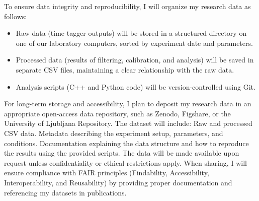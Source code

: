 \documentclass{article}
\theoremstyle{mytheoremstyle}
\theoremstyle{mytheoremstyle}
\theoremstyle{myproblemstyle}
\begin{document}
To ensure data integrity and reproducibility, I will organize my research data as follows:
\begin{itemize}
	\item Raw data (time tagger outputs) will be stored in a structured directory on one of our laboratory computers, sorted by experiment date and parameters.
	\item Processed data (results of filtering, calibration, and analysis) will be saved in separate CSV files, maintaining a clear relationship with the raw data.
	\item Analysis scripts (C++ and Python code) will be version-controlled using Git.
\end{itemize}
For long-term storage and accessibility, I plan to deposit my research data in an appropriate open-access data repository,
such as Zenodo, Figshare, or the University of Ljubljana Repository. The dataset will include:
Raw and processed CSV data.
Metadata describing the experiment setup, parameters, and conditions.
Documentation explaining the data structure and how to reproduce the results using the provided scripts.
The data will be made available upon request unless confidentiality or ethical restrictions apply.
When sharing, I will ensure compliance with FAIR principles (Findability, Accessibility,
Interoperability, and Reusability) by providing proper documentation and referencing my datasets in publications.
\newpage


\end{document}
